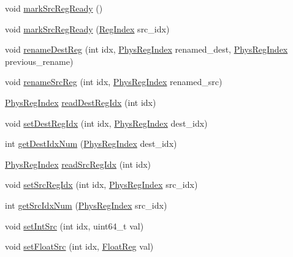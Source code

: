 \begin{DoxyCompactItemize}
\item 
void \hyperlink{classInOrderDynInst_acd6444fdff2557922a35895eccab2d0f}{markSrcRegReady} ()
\item 
void \hyperlink{classInOrderDynInst_a20a741d6245dcbf24bb3bc167946e1ec}{markSrcRegReady} (\hyperlink{classInOrderDynInst_a36d25e03e43fa3bb4c5482cbefe5e0fb}{RegIndex} src\_\-idx)
\item 
void \hyperlink{classInOrderDynInst_a9ae02d3c598d15a5c835ab7d4e647ce1}{renameDestReg} (int idx, \hyperlink{classInOrderDynInst_a5ec29599c4bc29a3054c451674969e7b}{PhysRegIndex} renamed\_\-dest, \hyperlink{classInOrderDynInst_a5ec29599c4bc29a3054c451674969e7b}{PhysRegIndex} previous\_\-rename)
\item 
void \hyperlink{classInOrderDynInst_af3d4e52aa8ea0b526cd9f78f67127f36}{renameSrcReg} (int idx, \hyperlink{classInOrderDynInst_a5ec29599c4bc29a3054c451674969e7b}{PhysRegIndex} renamed\_\-src)
\item 
\hyperlink{classInOrderDynInst_a5ec29599c4bc29a3054c451674969e7b}{PhysRegIndex} \hyperlink{classInOrderDynInst_a6483def73c0dfa46ba34dc4ca72f19ce}{readDestRegIdx} (int idx)
\item 
void \hyperlink{classInOrderDynInst_a52c4bf83c16312f4158a64c39cb17969}{setDestRegIdx} (int idx, \hyperlink{classInOrderDynInst_a5ec29599c4bc29a3054c451674969e7b}{PhysRegIndex} dest\_\-idx)
\item 
int \hyperlink{classInOrderDynInst_aa20ecc7091e255ecf38ffd5694b2c974}{getDestIdxNum} (\hyperlink{classInOrderDynInst_a5ec29599c4bc29a3054c451674969e7b}{PhysRegIndex} dest\_\-idx)
\item 
\hyperlink{classInOrderDynInst_a5ec29599c4bc29a3054c451674969e7b}{PhysRegIndex} \hyperlink{classInOrderDynInst_aba797300f2818a94dc72addfafbb7c4b}{readSrcRegIdx} (int idx)
\item 
void \hyperlink{classInOrderDynInst_a45e8ff35e5bd48f665ecbd309edc554d}{setSrcRegIdx} (int idx, \hyperlink{classInOrderDynInst_a5ec29599c4bc29a3054c451674969e7b}{PhysRegIndex} src\_\-idx)
\item 
int \hyperlink{classInOrderDynInst_a387c4c59efe1725330826a896a18745c}{getSrcIdxNum} (\hyperlink{classInOrderDynInst_a5ec29599c4bc29a3054c451674969e7b}{PhysRegIndex} src\_\-idx)
\item 
void \hyperlink{classInOrderDynInst_aeb30df1baf9f60e687deeb0ae66ed130}{setIntSrc} (int idx, uint64\_\-t val)
\item 
void \hyperlink{classInOrderDynInst_a13221677b93471d0bdeaa974555be906}{setFloatSrc} (int idx, \hyperlink{classInOrderDynInst_a75484259f1855aabc8d74c6eb1cfe186}{FloatReg} val)

\end{DoxyCompactItemize}
